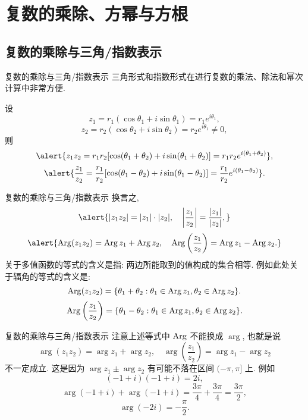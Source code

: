 \section{复数的乘除、方幂与方根}

\subsection{复数的乘除与三角/指数表示}
\begin{frame}{复数的乘除与三角/指数表示}
\onslide<+->
三角形式和指数形式在进行复数的乘法、除法和幂次计算中非常方便.
\onslide<+->
\begin{theorem}
设
\[z_1=r_1(\cos\theta_1+i\sin\theta_1)=r_1e^{i\theta_1},\]
\[z_2=r_2(\cos\theta_2+i\sin\theta_2)=r_2e^{i\theta_1}\neq 0,\]
则
\[\alert{z_1z_2=r_1r_2[\cos(\theta_1+\theta_2)+i\sin(\theta_1+\theta_2)]=r_1r_2e^{i(\theta_1+\theta_2)}},\]
\[\alert{\frac{z_1}{z_2}=\frac{r_1}{r_2}[\cos(\theta_1-\theta_2)+i\sin(\theta_1-\theta_2)]=\frac{r_1}{r_2}e^{i(\theta_1-\theta_2)}}.\]
\end{theorem}
\end{frame}


\begin{frame}{复数的乘除与三角/指数表示}
\onslide<+->
换言之,
\[\alert{|z_1z_2|=|z_1|\cdot|z_2|,\quad\abs{\frac{z_1}{z_2}}=\frac{|z_1|}{|z_2|},}\]
\onslide<+->
\[\alert{\Arg(z_1z_2)=\Arg z_1+\Arg z_2,\quad
\Arg\left(\frac{z_1}{z_2}\right)=\Arg z_1-\Arg z_2.}\]
\onslide<+->
关于多值函数的等式的含义是指: 两边所能取到的值构成的集合相等.
\onslide<+->
例如此处关于辐角的等式的含义是:
\[\operatorname{Arg}(z_1z_2)={\left\{\theta_1+\theta_2:\theta_1\in\operatorname{Arg} z_1,\theta_2\in\operatorname{Arg} z_2\right\}}.\]
\[\operatorname{Arg}\left(\frac{z_1}{z_2}\right)={\left\{\theta_1-\theta_2:\theta_1\in\operatorname{Arg} z_1,\theta_2\in\operatorname{Arg} z_2\right\}}.\]
\end{frame}


\begin{frame}{复数的乘除与三角/指数表示}
\onslide<+->
注意上述等式中 $\operatorname{Arg}$ 不能换成 $\arg$, 也就是说
\[\arg(z_1z_2)=\arg z_1+\arg z_2,\quad
\arg\left(\frac{z_1}{z_2}\right)=\arg z_1-\arg z_2\]
\alert{不一定成立}.
\onslide<+->
这是因为 $\arg z_1\pm\arg z_2$ 有可能不落在区间 $(-\pi,\pi]$ 上.
\onslide<+->
例如
\[(-1+i)(-1+i)=2i,\]
\vspace{-0.5\baselineskip}
\onslide<+->
\[\arg(-1+i)+\arg(-1+i)=\frac{3\pi}4+\frac{3\pi}4=\frac{3\pi}2,\]
\vspace{-0.5\baselineskip}
\onslide<+->
\[\arg(-2i)=-\frac\pi2.\]
\end{frame}


